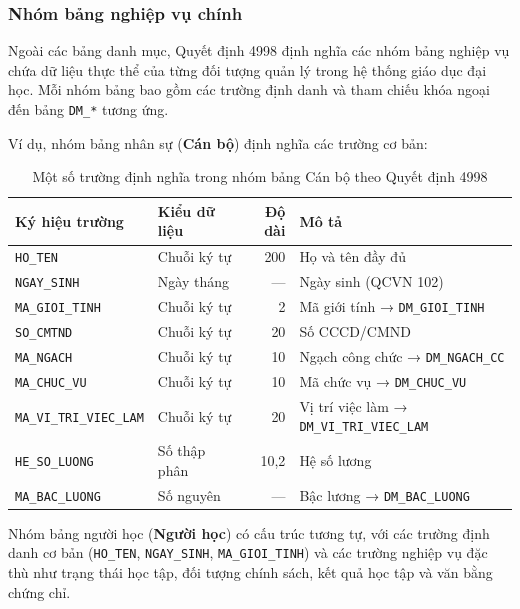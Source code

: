 \subsubsection{Nhóm bảng nghiệp vụ chính}

Ngoài các bảng danh mục, Quyết định 4998 định nghĩa các nhóm bảng nghiệp vụ chứa dữ liệu thực thể của từng đối tượng quản lý trong hệ thống giáo dục đại học. Mỗi nhóm bảng bao gồm các trường định danh và tham chiếu khóa ngoại đến bảng \texttt{DM\_*} tương ứng.

Ví dụ, nhóm bảng nhân sự (\textbf{Cán bộ}) định nghĩa các trường cơ bản:

\begin{table}[H]
\centering
\renewcommand{\arraystretch}{1.4}
\begin{tabularx}{\textwidth}{|l|l|r|X|}
\hline
\textbf{Ký hiệu trường} & \textbf{Kiểu dữ liệu} & \textbf{Độ dài} & \textbf{Mô tả} \\
\hline
\texttt{HO\_TEN} & Chuỗi ký tự & 200 & Họ và tên đầy đủ \\
\hline
\texttt{NGAY\_SINH} & Ngày tháng & — & Ngày sinh (QCVN 102) \\
\hline
\texttt{MA\_GIOI\_TINH} & Chuỗi ký tự & 2 & Mã giới tính → \texttt{DM\_GIOI\_TINH} \\
\hline
\texttt{SO\_CMTND} & Chuỗi ký tự & 20 & Số CCCD/CMND \\
\hline
\texttt{MA\_NGACH} & Chuỗi ký tự & 10 & Ngạch công chức → \texttt{DM\_NGACH\_CC} \\
\hline
\texttt{MA\_CHUC\_VU} & Chuỗi ký tự & 10 & Mã chức vụ → \texttt{DM\_CHUC\_VU} \\
\hline
\texttt{MA\_VI\_TRI\_VIEC\_LAM} & Chuỗi ký tự & 20 & Vị trí việc làm → \texttt{DM\_VI\_TRI\_VIEC\_LAM} \\
\hline
\texttt{HE\_SO\_LUONG} & Số thập phân & 10,2 & Hệ số lương \\
\hline
\texttt{MA\_BAC\_LUONG} & Số nguyên & — & Bậc lương → \texttt{DM\_BAC\_LUONG} \\
\hline
\end{tabularx}
\caption{Một số trường định nghĩa trong nhóm bảng Cán bộ theo Quyết định 4998}
\label{tab:canbo-fields}
\end{table}

Nhóm bảng người học (\textbf{Người học}) có cấu trúc tương tự, với các trường định danh cơ bản (\texttt{HO\_TEN}, \texttt{NGAY\_SINH}, \texttt{MA\_GIOI\_TINH}) và các trường nghiệp vụ đặc thù như trạng thái học tập, đối tượng chính sách, kết quả học tập và văn bằng chứng chỉ.

